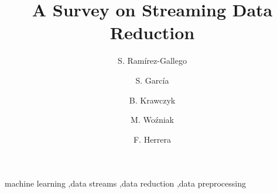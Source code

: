 \documentclass[preprint,12pt]{elsarticle}
\begin{document}
\begin{frontmatter}



\title{A Survey on Streaming Data Reduction}


\author[ugr]{S. Ram\'{i}rez-Gallego}

\author[ugr]{S. Garc\'ia}

\author[pwr]{B. Krawczyk}

\author[pwr]{M. Wo\'zniak}

\author[ugr]{F. Herrera}

\address[ugr]{Department of Computer Science and Artificial Intelligence, CITIC-UGR, University of Granada, 18071 Granada, Spain}
	
\address[pwr]{Department of Computer Science, Wroc\l{}aw University of Technology, Wyb. Wyspianskiego 27, 50-370 Wroc\l{}aw, Poland}


\begin{abstract}

\end{abstract}

\begin{keyword}



machine learning \sep data streams \sep data reduction \sep data preprocessing

\end{keyword}

\end{frontmatter}
\end{document}
